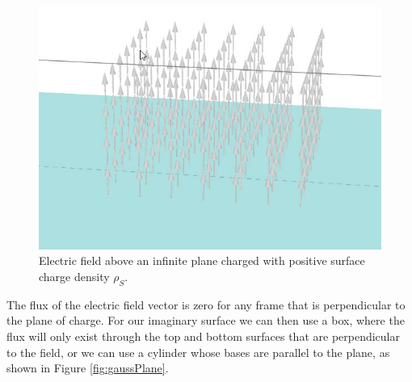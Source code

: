 \documentclass{ximera}
\begin{document}
\begin{figure}[htbp]
\begin{center}
\includegraphics[scale=0.8]{../jpg/3DFieldInfinitePlane.jpg}
\end{center}
\caption{Electric field above an infinite plane charged with positive surface charge density $\rho_S$.}
\label{fig:3DFieldInfinitePlane}
\end{figure}


The flux of the electric field vector is zero for any frame that is perpendicular to the plane of charge. For our imaginary surface we can then use a box, where the flux will only exist through the top and bottom surfaces that are perpendicular to the field, or we can use a cylinder whose bases are parallel to the plane, as shown in Figure \ref{fig:gaussPlane}. 
\end{document}

